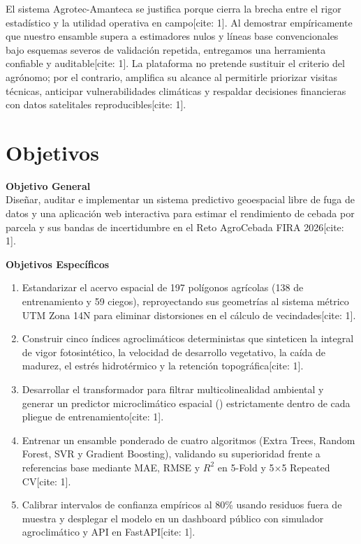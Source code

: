 \documentclass[11pt,a4paper]{article}
\newcommand{\code}[1]{\tcbox[on line, boxsep=1pt, left=3pt, right=3pt, top=1pt, bottom=1pt, colback=mintsoft, colframe=mintsoft, arc=2pt]{\texttt{\footnotesize\color{forestdeep}#1}}}
\begin{document}
El sistema Agrotec-Amanteca se justifica porque cierra la brecha entre el rigor estadístico y la utilidad operativa en campo[cite: 1]. Al demostrar empíricamente que nuestro ensamble supera a estimadores nulos y líneas base convencionales bajo esquemas severos de validación repetida, entregamos una herramienta confiable y auditable[cite: 1]. La plataforma no pretende sustituir el criterio del agrónomo; por el contrario, amplifica su alcance al permitirle priorizar visitas técnicas, anticipar vulnerabilidades climáticas y respaldar decisiones financieras con datos satelitales reproducibles[cite: 1].

\section{Objetivos}
\begin{tcolorbox}[colback=mintsoft, colframe=emeraldmid, boxrule=0.6pt, arc=3pt, left=10pt, right=10pt, top=8pt, bottom=8pt]
\textbf{\sffamily\color{forestdeep}Objetivo General}\\[3pt]
Diseñar, auditar e implementar un sistema predictivo geoespacial libre de fuga de datos y una aplicación web interactiva para estimar el rendimiento de cebada por parcela y sus bandas de incertidumbre en el Reto AgroCebada FIRA 2026[cite: 1].
\end{tcolorbox}

\textbf{\sffamily\color{forestdeep}Objetivos Específicos}
\begin{enumerate}
  \item Estandarizar el acervo espacial de 197 polígonos agrícolas (138 de entrenamiento y 59 ciegos), reproyectando sus geometrías al sistema métrico UTM Zona 14N para eliminar distorsiones en el cálculo de vecindades[cite: 1].
  \item Construir cinco índices agroclimáticos deterministas que sinteticen la integral de vigor fotosintético, la velocidad de desarrollo vegetativo, la caída de madurez, el estrés hidrotérmico y la retención topográfica[cite: 1].
  \item Desarrollar el transformador \code{LeakFreeSmartPearsonIDW} para filtrar multicolinealidad ambiental y generar un predictor microclimático espacial (\code{spatial\_idw\_yield}) estrictamente dentro de cada pliegue de entrenamiento[cite: 1].
  \item Entrenar un ensamble ponderado de cuatro algoritmos (Extra Trees, Random Forest, SVR y Gradient Boosting), validando su superioridad frente a referencias base mediante MAE, RMSE y $R^2$ en 5-Fold y 5$\times$5 Repeated CV[cite: 1].
  \item Calibrar intervalos de confianza empíricos al 80\% usando residuos fuera de muestra y desplegar el modelo en un dashboard público con simulador agroclimático y API en FastAPI[cite: 1].
\end{enumerate}
\end{document}
